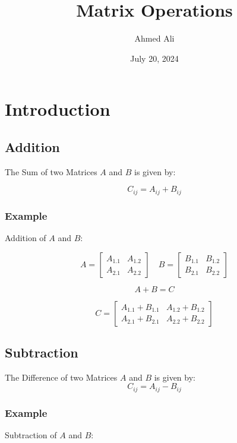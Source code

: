 \documentclass[10pt]{article}
\begin{document}
\author{Ahmed Ali}
\title{Matrix Operations}
\date{July 20, 2024}

\maketitle

\section{Introduction}

\subsection{Addition}

The Sum of two Matrices \(A\) and \(B\) is given by:

\[C_{ij} = A_{ij} + B_{ij}\]

\subsubsection{Example}

Addition of \(A\) and \(B\):

\[
A = \begin{bmatrix} 
A_{1.1} & A_{1.2} \\   
A_{2.1} & A_{2.2}
\end{bmatrix}  
\quad
B = \begin{bmatrix}
B_{1.1} & B_{1.2} \\
B_{2.1} & B_{2.2}
\end{bmatrix}
\]

\[
A + B = C
\]

\[
C = \begin{bmatrix} 
A_{1.1} + B_{1.1} & A_{1.2} + B_{1.2} \\   
A_{2.1} + B_{2.1} & A_{2.2} + B_{2.2}
\end{bmatrix}
\]

\subsection{Subtraction}
The Difference of two Matrices \(A\) and \(B\) is given by:
\[C_{ij} = A_{ij} - B_{ij}\]

\subsubsection{Example}

Subtraction of \(A\) and \(B\): 
\end{document}
